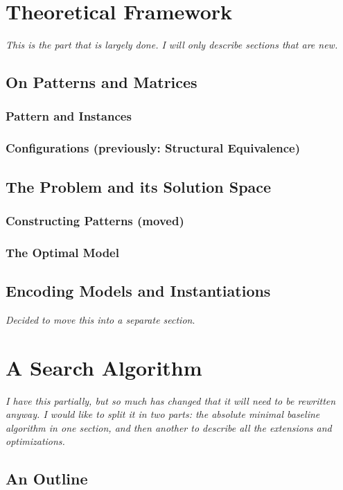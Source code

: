 \documentclass[a4paper,notoc,oneside]{tufte-book}
\begin{document}
\chapter{Theoretical Framework}

\emph{This is the part that is largely done. I will only describe sections that are new.}

\section{On Patterns and Matrices}
\subsection{Pattern and Instances}
\subsection{Configurations (previously: Structural Equivalence)}

\section{The Problem and its Solution Space}
\subsection{Constructing Patterns (moved)}
\subsection{The Optimal Model}

\section{Encoding Models and Instantiations}

\emph{Decided to move this into a separate section}. 

\chapter{A Search Algorithm}

\emph{I have this partially, but so much has changed that it will need to be rewritten anyway. I would like to split it in two parts: the absolute minimal baseline algorithm in one section, and then another to describe all the extensions and optimizations.}\\

\section{An Outline}
\end{document}
